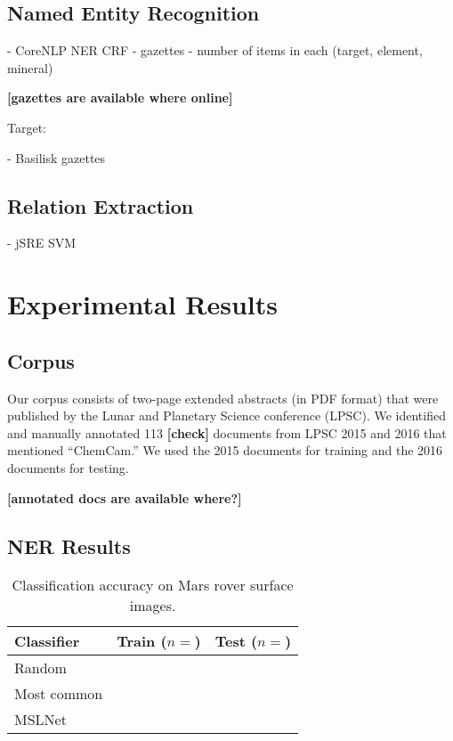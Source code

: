 \documentclass[letterpaper]{article} %
\begin{document}
\subsection{Named Entity Recognition}

- CoreNLP NER CRF
- gazettes - number of items in each (target, element, mineral)

{\bf [gazettes are available where online]}

Target:


- Basilisk gazettes

\subsection{Relation Extraction}

- jSRE SVM

\section{Experimental Results}

\subsection{Corpus}

Our corpus consists of two-page extended abstracts (in PDF format) that
were published by the Lunar and Planetary Science conference (LPSC).  We
identified and manually annotated 113 {\bf [check]} documents from
LPSC 2015 and 2016 that mentioned ``ChemCam.''  We used the 2015
documents for training and the 2016 documents for testing.

{\bf [annotated docs are available where?]}

\subsection{NER Results}

\begin{table}
\caption{Classification accuracy on Mars rover surface images.}
\label{tab:msl}
\begin{center}
\begin{tabular}{l|ll}
Classifier & Train ($n=$) & Test ($n=$) \\ \hline
Random & & \\
Most common & & \\
MSLNet & & \\ \hline
\end{tabular}
\end{center}
\end{table}
\end{document}
